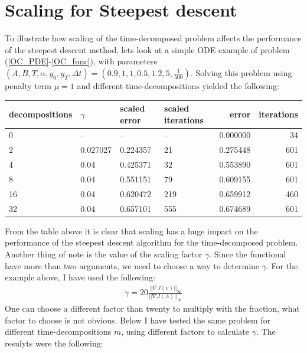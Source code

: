 \documentclass[11pt,a4paper]{article}
\begin{document}
\section{Scaling for Steepest descent}
To illustrate how scaling of the time-decomposed problem affects the performance of the steepest descent method, lets look at a simple ODE example of problem (\ref{OC_PDE}-\ref{OC_func}), with parameters $(A,B,T,\alpha,y_0,y_T,\Delta t)=(0.9,1,1,0.5,1.2,5,\frac{1}{500})$. Solving this problem using penalty term $\mu=1$ and different time-decompositions yielded the following:
\\
\begin{tabular}{llllrr}
\toprule
{}decompositions &     $\gamma$ & scaled error & scaled iterations &  error &  iterations \\
\midrule
0  &        -- &           -- &                -- &        0.000000 &                   34 \\
2  &  0.027027 &     0.224357 &                21 &        0.275448 &                  601 \\
4  &      0.04 &     0.425371 &                32 &        0.553890 &                  601 \\
8  &      0.04 &     0.551151 &                79 &        0.609155 &                  601 \\
16 &      0.04 &     0.620472 &               219 &        0.659912 &                  460 \\
32 &      0.04 &     0.657101 &               555 &        0.674689 &                  601 \\
\bottomrule
\end{tabular}
From the table above it is clear that scaling has a huge impact on the performance of the steepest descent algorithm for the time-decomposed problem. Another thing of note is the value of the scaling factor $\gamma$. Since the functional have more than two arguments, we need to choose a way to determine $\gamma$. For the example above, I have used the following:
\begin{align*}
\gamma = 20\frac{||\nabla J(v)||_{\infty}}{||\nabla J(\Lambda)||_{\infty}}
\end{align*} 
One can choose a different factor than twenty to multiply with the fraction, what factor to choose is not obvious. Below I have tested the same problem for different time-decompositions $m$, using different factors to calculate $\gamma$. The resulyts were the following:
\\
\end{document}
